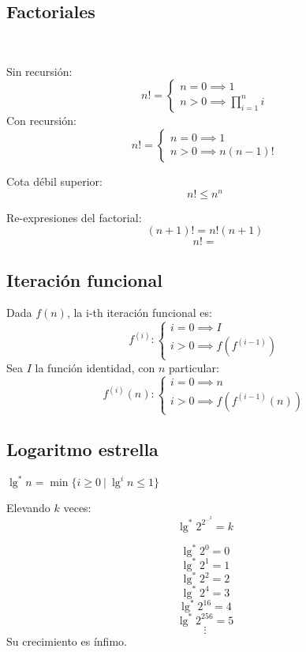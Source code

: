 \documentclass[tikz,11pt,fleqn]{book} %
\begin{document}
\subsection{Factoriales}
\begin{definition}~

    Sin recursión:
    $$n!=
    \begin{cases}
        n=0\implies 1 \\
        n>0\implies \prod_{i=1}^n i
    \end{cases}$$
    Con recursión:
    $$n!=
    \begin{cases}
        n=0 \implies 1\\
        n>0 \implies n(n-1)!
    \end{cases}$$
\end{definition}

\begin{fact}
Cota débil superior:
    $$n!\le n^n$$
\end{fact}

Re-expresiones del factorial:
$$ (n+1)!=n!(n+1) $$
$$ n! =  $$

\subsection{Iteración funcional}
Dada $f(n)$, la i-th iteración funcional es:
    $$f^{(i)}:
    \begin{cases}
        i=0\implies I \\
        i>0\implies f(f^{(i-1)})
    \end{cases}$$
    Sea $I$ la función identidad, con $n$ particular:
    $$f^{(i)}(n):
    \begin{cases}
        i=0\implies n \\
        i>0\implies f(f^{(i-1)}(n))
    \end{cases}$$

\subsection{Logaritmo estrella}
    \begin{definition}
        $\lg^*n=\min\{i\ge0~|~\lg^{i}n\le1\}$

        Elevando $k$ veces:
         $$ \lg^*2^{2^{\cdots^{2}}}=k $$
    \end{definition}
    \begin{fact}[Crecimiento]
        $$ \lg^*2^0=0 $$
        $$ \lg^*2^1=1 $$
        $$ \lg^*2^2=2 $$
        $$ \lg^*2^4=3 $$
        $$ \lg^*2^{16}=4 $$
        $$ \lg^*2^{256}=5 $$
        $$ \vdots $$
        Su crecimiento es ínfimo.
    \end{fact}
\end{document}
